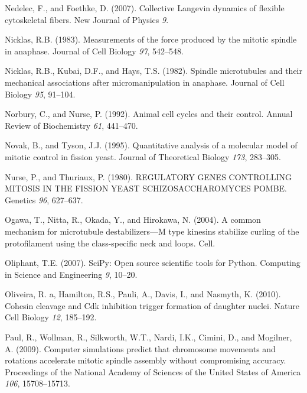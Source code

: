 \documentclass[12pt,a4paper,twoside,openright]{book}
\begin{document}
Nedelec, F., and Foethke, D. (2007). Collective Langevin dynamics of
flexible cytoskeletal fibers. New Journal of Physics \emph{9}.

Nicklas, R.B. (1983). Measurements of the force produced by the mitotic
spindle in anaphase. Journal of Cell Biology \emph{97}, 542--548.

Nicklas, R.B., Kubai, D.F., and Hays, T.S. (1982). Spindle microtubules
and their mechanical associations after micromanipulation in anaphase.
Journal of Cell Biology \emph{95}, 91--104.

Norbury, C., and Nurse, P. (1992). Animal cell cycles and their control.
Annual Review of Biochemistry \emph{61}, 441--470.

Novak, B., and Tyson, J.J. (1995). Quantitative analysis of a molecular
model of mitotic control in fission yeast. Journal of Theoretical
Biology \emph{173}, 283--305.

Nurse, P., and Thuriaux, P. (1980). REGULATORY GENES CONTROLLING MITOSIS
IN THE FISSION YEAST SCHIZOSACCHAROMYCES POMBE. Genetics \emph{96},
627--637.

Ogawa, T., Nitta, R., Okada, Y., and Hirokawa, N. (2004). A common
mechanism for microtubule destabilizers---M type kinesins stabilize
curling of the protofilament using the class-specific neck and loops.
Cell.

Oliphant, T.E. (2007). SciPy: Open source scientific tools for Python.
Computing in Science and Engineering \emph{9}, 10--20.

Oliveira, R. a, Hamilton, R.S., Pauli, A., Davis, I., and Nasmyth, K.
(2010). Cohesin cleavage and Cdk inhibition trigger formation of
daughter nuclei. Nature Cell Biology \emph{12}, 185--192.

Paul, R., Wollman, R., Silkworth, W.T., Nardi, I.K., Cimini, D., and
Mogilner, A. (2009). Computer simulations predict that chromosome
movements and rotations accelerate mitotic spindle assembly without
compromising accuracy. Proceedings of the National Academy of Sciences
of the United States of America \emph{106}, 15708--15713.
\end{document}
